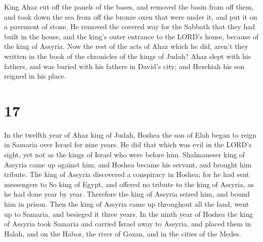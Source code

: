  King Ahaz cut off the panels of the bases, and removed
the basin from off them, and took down the sea from off the bronze oxen
that were under it, and put it on a pavement of stone. 
He removed the covered way for the Sabbath that they had built in the
house, and the king's outer entrance to the LORD's house, because of the
king of Assyria.  Now the rest of the acts of Ahaz which
he did, aren't they written in the book of the chronicles of the kings
of Judah?  Ahaz slept with his fathers, and was buried
with his fathers in David's city; and Hezekiah his son reigned in his
place.

\hypertarget{section-16}{%
\section{17}\label{section-16}}

 In the twelfth year of Ahaz king of Judah, Hoshea the son
of Elah began to reign in Samaria over Israel for nine years.
 He did that which was evil in the LORD's sight, yet not
as the kings of Israel who were before him.  Shalmaneser
king of Assyria came up against him; and Hoshea became his servant, and
brought him tribute.  The king of Assyria discovered a
conspiracy in Hoshea; for he had sent messengers to So king of Egypt,
and offered no tribute to the king of Assyria, as he had done year by
year. Therefore the king of Assyria seized him, and bound him in prison.
 Then the king of Assyria came up throughout all the land,
went up to Samaria, and besieged it three years.  In the
ninth year of Hoshea the king of Assyria took Samaria and carried Israel
away to Assyria, and placed them in Halah, and on the Habor, the river
of Gozan, and in the cities of the Medes.

